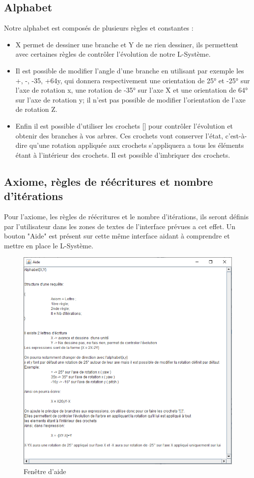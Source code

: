\subsection{Alphabet}
\label{sec:Alphabet}
Notre alphabet est composés de plusieurs règles et constantes :\\
\begin{itemize}
    \item X permet de dessiner une branche et Y de ne rien dessiner, ils permettent avec certaines règles de contrôler l'évolution de notre L-Système.
    \item Il est possible de modifier l'angle d'une branche en utilisant par exemple les +, -, -35, +64y, qui donnera respectivement une orientation de 25° et -25° sur l'axe de rotation x, une rotation de -35° sur l'axe X et une orientation de 64° sur l'axe de rotation y; il n'est pas possible de modifier l'orientation de l'axe de rotation Z.
\item Enfin il est possible d'utiliser les crochets [] pour contrôler l'évolution et obtenir des branches à vos arbres. Ces crochets vont conserver l'état, c’est-à-dire qu'une rotation appliquée aux crochets s'appliquera a tous les éléments étant à l'intérieur des crochets. Il est possible d'imbriquer des crochets.\\
\end{itemize}

\subsection{Axiome, règles de réécritures et nombre d'itérations}
Pour l'axiome, les règles de réécritures et le nombre d'itérations, ils seront définis par l'utilisateur dans les zones de textes de l'interface prévues a cet effet. 
Un bouton "Aide" est présent sur cette même interface aidant à comprendre et mettre en place le L-Système.

\begin{figure}[h!]
    \centering
    \includegraphics[width=0.8\linewidth]{pics/aideGUI.png}
    \caption{Fenêtre d'aide}
    \label{fig:help_frame}
\end{figure}

